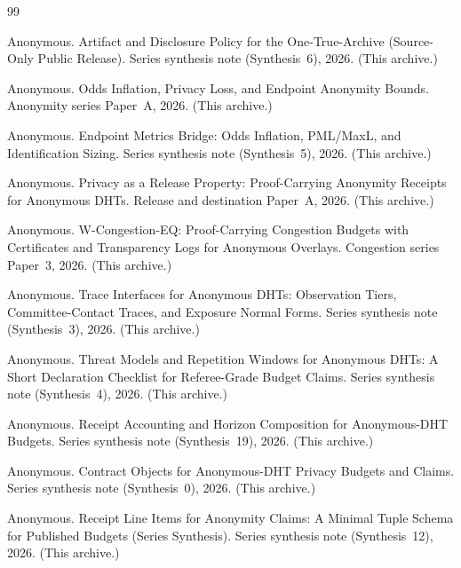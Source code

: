\documentclass[11pt]{article}
\begin{document}
\begin{thebibliography}{99}\small

Anonymous.
\newblock Artifact and Disclosure Policy for the One-True-Archive (Source-Only Public Release).
\newblock Series synthesis note (Synthesis~6), 2026. (This archive.)

Anonymous.
\newblock Odds Inflation, Privacy Loss, and Endpoint Anonymity Bounds.
\newblock Anonymity series Paper~A, 2026. (This archive.)

Anonymous.
\newblock Endpoint Metrics Bridge: Odds Inflation, PML/MaxL, and Identification Sizing.
\newblock Series synthesis note (Synthesis~5), 2026. (This archive.)

Anonymous.
\newblock Privacy as a Release Property: Proof-Carrying Anonymity Receipts for Anonymous DHTs.
\newblock Release and destination Paper~A, 2026. (This archive.)

Anonymous.
\newblock W-Congestion-EQ: Proof-Carrying Congestion Budgets with Certificates and Transparency Logs for Anonymous Overlays.
\newblock Congestion series Paper~3, 2026. (This archive.)

Anonymous.
\newblock Trace Interfaces for Anonymous DHTs: Observation Tiers, Committee-Contact Traces, and Exposure Normal Forms.
\newblock Series synthesis note (Synthesis~3), 2026. (This archive.)

Anonymous.
\newblock Threat Models and Repetition Windows for Anonymous DHTs: A Short Declaration Checklist for Referee-Grade Budget Claims.
\newblock Series synthesis note (Synthesis~4), 2026. (This archive.)

Anonymous.
\newblock Receipt Accounting and Horizon Composition for Anonymous-DHT Budgets.
\newblock Series synthesis note (Synthesis~19), 2026. (This archive.)

Anonymous.
\newblock Contract Objects for Anonymous-DHT Privacy Budgets and Claims.
\newblock Series synthesis note (Synthesis~0), 2026. (This archive.)

Anonymous.
\newblock Receipt Line Items for Anonymity Claims: A Minimal Tuple Schema for Published Budgets (Series Synthesis).
\newblock Series synthesis note (Synthesis~12), 2026. (This archive.)


\end{thebibliography}
\end{document}
